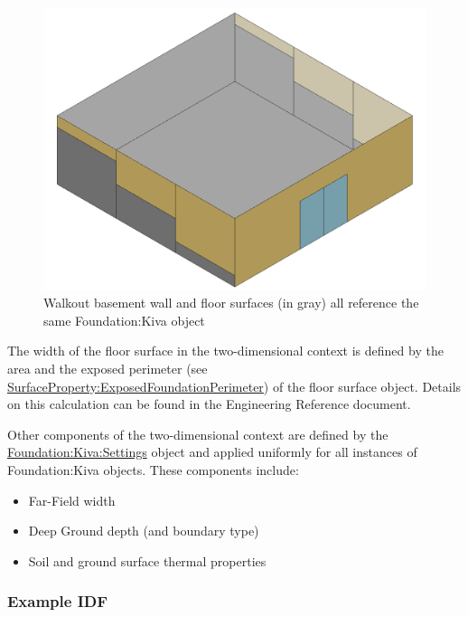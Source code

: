 \begin{figure}
\centering
\includegraphics{media/kiva-walkout-segs.png}
\caption{Walkout basement wall and floor surfaces (in gray) all
reference the same Foundation:Kiva object\label{fig:wo-s}}
\end{figure}

The width of the floor surface in the two-dimensional context is defined
by the area and the exposed perimeter (see
\hyperref[surfaceproperty-exposedfoundationperimeter]{SurfaceProperty:ExposedFoundationPerimeter}) of the floor surface object.
Details on this calculation can be found in the Engineering Reference
document.

Other components of the two-dimensional context are defined by the
\hyperref[foundation-kiva-settings]{Foundation:Kiva:Settings} object and applied uniformly for all instances
of Foundation:Kiva objects. These components include:

\begin{itemize}
\tightlist
\item
  Far-Field width
\item
  Deep Ground depth (and boundary type)
\item
  Soil and ground surface thermal properties
\end{itemize}

\subsubsection{Example IDF}\label{example-idf}

